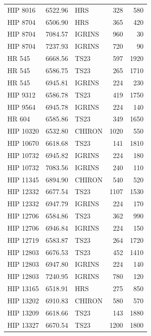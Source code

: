 {\begin{scriptsize}
\begin{longtable}{|l|rlrr|}
    HIP 8016 &  6522.96 &        HRS &      328 &   580 \\
    HIP 8704 &  6506.90 &        HRS &      365 &   420 \\
    HIP 8704 &  7084.57 &     IGRINS &      960 &    30 \\
    HIP 8704 &  7237.93 &     IGRINS &      720 &    90 \\
      HR 545 &  6668.56 &       TS23 &      597 &  1920 \\
      HR 545 &  6586.75 &       TS23 &      265 &  1710 \\
      HR 545 &  6945.81 &     IGRINS &      224 &   230 \\
    HIP 9312 &  6586.78 &       TS23 &      419 &  1750 \\
    HIP 9564 &  6945.78 &     IGRINS &      224 &   140 \\
      HR 604 &  6585.86 &       TS23 &      349 &  1650 \\
   HIP 10320 &  6532.80 &     CHIRON &     1020 &   550 \\
   HIP 10670 &  6618.68 &       TS23 &      141 &  1810 \\
   HIP 10732 &  6945.82 &     IGRINS &      224 &   180 \\
   HIP 10732 &  7083.56 &     IGRINS &      240 &   110 \\
   HIP 11345 &  6894.90 &     CHIRON &      540 &   520 \\
   HIP 12332 &  6677.54 &       TS23 &     1107 &  1530 \\
   HIP 12332 &  6947.79 &     IGRINS &      224 &   170 \\
   HIP 12706 &  6584.86 &       TS23 &      362 &   990 \\
   HIP 12706 &  6946.84 &     IGRINS &      224 &   150 \\
   HIP 12719 &  6583.87 &       TS23 &      264 &  1720 \\
   HIP 12803 &  6676.53 &       TS23 &      452 &  1410 \\
   HIP 12803 &  6947.80 &     IGRINS &      224 &   140 \\
   HIP 12803 &  7240.95 &     IGRINS &      780 &   120 \\
   HIP 13165 &  6518.91 &        HRS &      275 &   850 \\
   HIP 13202 &  6910.83 &     CHIRON &      580 &   570 \\
   HIP 13209 &  6618.66 &       TS23 &      143 &  1880 \\
   HIP 13327 &  6670.54 &       TS23 &     1200 &  1800 \\

\end{longtable}
\end{scriptsize}}
